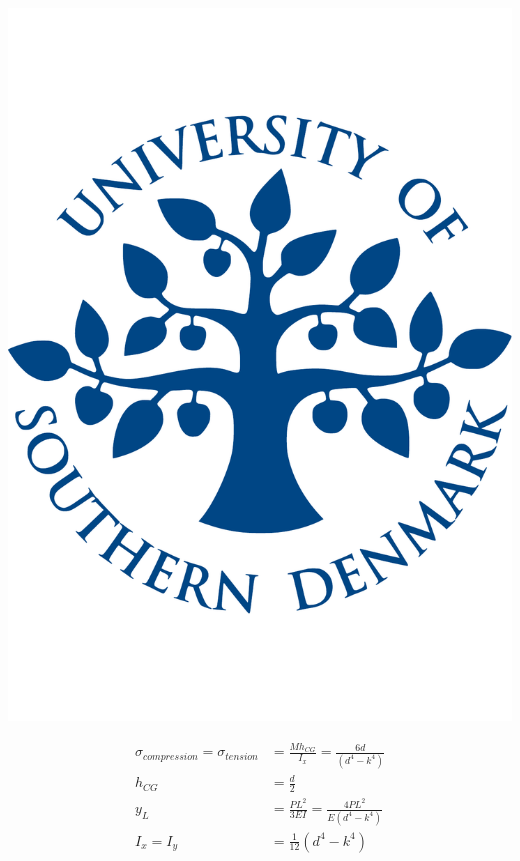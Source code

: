   \noindent\begin{minipage}{0.2\textwidth}%
      \includegraphics[width=\linewidth]{figures/sdu_logo.pdf}
  \end{minipage}%
  \hfill%
  \begin{minipage}{0.8\textwidth}
    \begin{equation}
    \begin{aligned}
      \sigma _{compression} = \sigma _{tension} &= \frac{M h_{CG}}{I_x} = \frac{6 d}{(d^4 - k^4)}\\
      h_{CG} &= \frac{d}{2} \\
      y_L &= \frac{P L^2}{3EI} = \frac{4 P L^2}{E (d^4 - k^4)}\\
      I_x = I_y &= \frac{1}{12} (d^4 - k^4)
      \end{aligned}
    \end{equation}
  \end{minipage}

